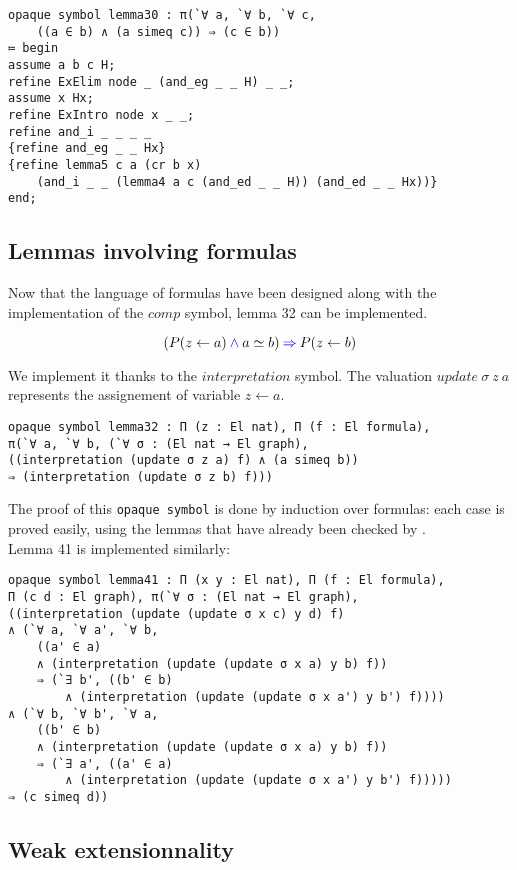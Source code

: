 \documentclass[a4paper]{article}
\begin{document}
\begin{lstlisting}
opaque symbol lemma30 : π(`∀ a, `∀ b, `∀ c, 
	((a ∈ b) ∧ (a simeq c)) ⇒ (c ∈ b))
≔ begin
assume a b c H;
refine ExElim node _ (and_eg _ _ H) _ _;
assume x Hx;
refine ExIntro node x _ _;
refine and_i _ _ _ _
{refine and_eg _ _ Hx}
{refine lemma5 c a (cr b x) 
	(and_i _ _ (lemma4 a c (and_ed _ _ H)) (and_ed _ _ Hx))}
end;
\end{lstlisting}

\subsection{Lemmas involving formulas}

Now that the language of formulas have been designed along with the implementation of the $comp$ symbol, lemma 32 can be implemented.

$$(P(z \leftarrow a) \mathbin{\color{blue} \wedge} a \simeq b) \mathbin{\color{blue} \Rightarrow} P(z \leftarrow b)$$

We implement it thanks to the $interpretation$ symbol. The valuation $update~\sigma~z~a$ represents the assignement of variable $z \leftarrow a$.

\begin{lstlisting}
opaque symbol lemma32 : Π (z : El nat), Π (f : El formula), 
π(`∀ a, `∀ b, (`∀ σ : (El nat → El graph),
((interpretation (update σ z a) f) ∧ (a simeq b)) 
⇒ (interpretation (update σ z b) f)))
\end{lstlisting}

The proof of this \texttt{opaque symbol} is done by induction over formulas: each case is proved easily, using the lemmas that have already been checked by \dedukti. \\

Lemma 41 is implemented similarly:

\begin{lstlisting}
opaque symbol lemma41 : Π (x y : El nat), Π (f : El formula), 
Π (c d : El graph), π(`∀ σ : (El nat → El graph), 
((interpretation (update (update σ x c) y d) f)
∧ (`∀ a, `∀ a', `∀ b, 
	((a' ∈ a) 
	∧ (interpretation (update (update σ x a) y b) f)) 
	⇒ (`∃ b', ((b' ∈ b) 
		∧ (interpretation (update (update σ x a') y b') f))))
∧ (`∀ b, `∀ b', `∀ a, 
	((b' ∈ b) 
	∧ (interpretation (update (update σ x a) y b) f)) 
	⇒ (`∃ a', ((a' ∈ a) 
		∧ (interpretation (update (update σ x a') y b') f))))) 
⇒ (c simeq d))
\end{lstlisting}

\subsection{Weak extensionnality}
\end{document}
